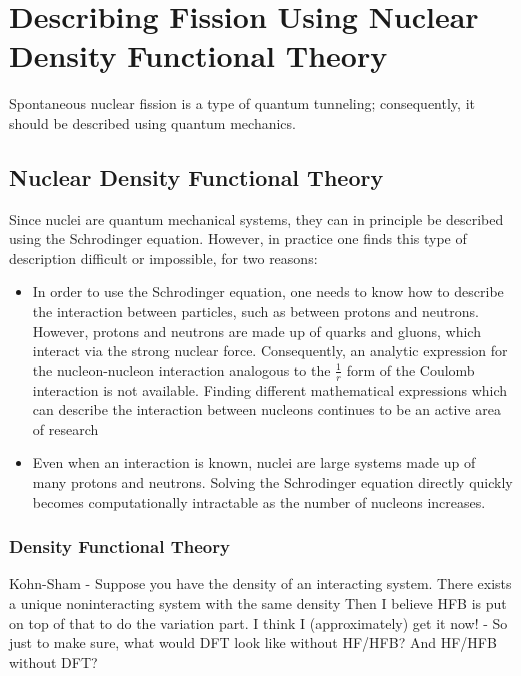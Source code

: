 \chapter{Describing Fission Using Nuclear Density Functional Theory}\label{chap:Model}
\maketitle

Spontaneous nuclear fission is a type of quantum tunneling; consequently, it should be described using quantum mechanics.

\section{Nuclear Density Functional Theory}
Since nuclei are quantum mechanical systems, they can in principle be described using the Schrodinger equation. However, in practice one finds this type of description difficult or impossible, for two reasons:

\begin{itemize}
\item In order to use the Schrodinger equation, one needs to know how to describe the interaction between particles, such as between protons and neutrons. However, protons and neutrons are made up of quarks and gluons, which interact via the strong nuclear force. Consequently, an analytic expression for the nucleon-nucleon interaction analogous to the $\frac{1}{r}$ form of the Coulomb interaction is not available. Finding different mathematical expressions which can describe the interaction between nucleons continues to be an active area of research \cite{lots of papers}
\item Even when an interaction is known, nuclei are large systems made up of many protons and neutrons. Solving the Schrodinger equation directly quickly becomes computationally intractable as the number of nucleons increases.
\end{itemize}


\subsection{Density Functional Theory}\label{sect:DFT}
Kohn-Sham - Suppose you have the density of an interacting system. There exists a unique noninteracting system with the same density
Then I believe HFB is put on top of that to do the variation part. I think I (approximately) get it now! - So just to make sure, what would DFT look like without HF/HFB? And HF/HFB without DFT?

